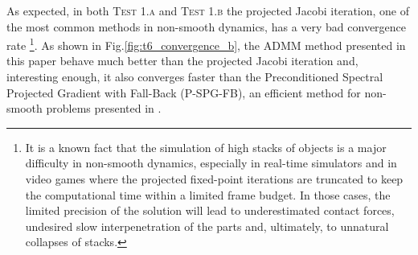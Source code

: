 \documentclass[final,3p]{elsarticle}
\begin{document}
As expected, in both \textsc{Test 1.a} and \textsc{Test 1.b} the projected Jacobi iteration, one of the most common
methods in non-smooth dynamics, has a very bad convergence rate \footnote{It is a known fact that the simulation 
of high stacks of objects is a major difficulty in non-smooth dynamics, especially in real-time simulators
and in video games where the projected fixed-point iterations are truncated to keep the computational
time within a limited frame budget. In those cases, the limited precision of the solution will lead to underestimated
contact forces, undesired slow interpenetration of the parts and, ultimately, to unnatural collapses of stacks.}.
As shown in Fig.\ref{fig:t6_convergence_b}, 
the ADMM method presented in this paper behave
much better than the projected Jacobi iteration and, interesting enough, it also converges faster
than the Preconditioned Spectral Projected Gradient with Fall-Back (P-SPG-FB), an
efficient method for non-smooth problems presented in \cite{hammadTOG2015}.
\end{document}
